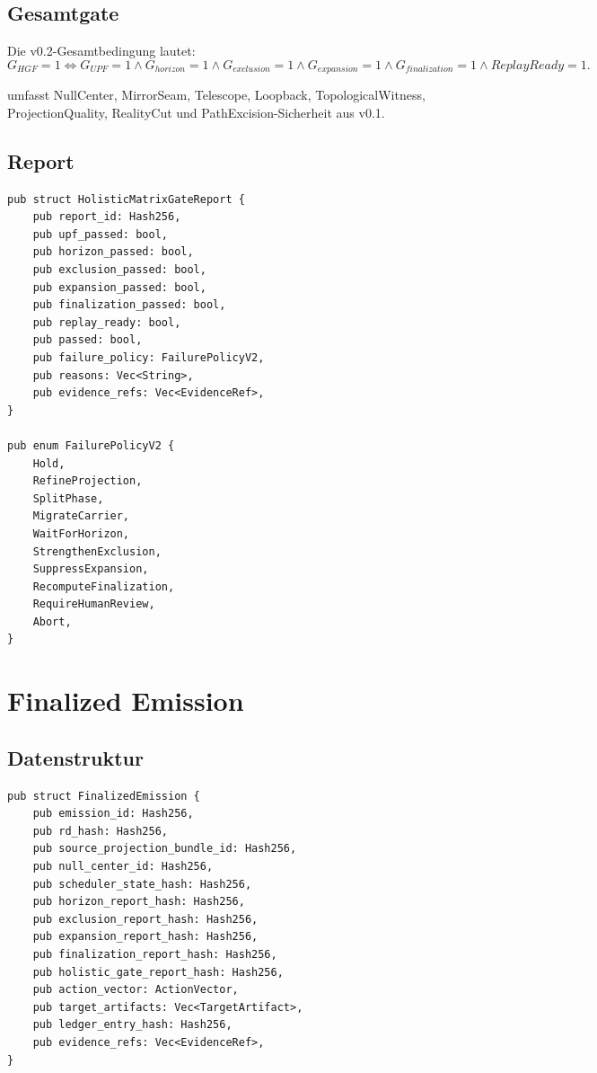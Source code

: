 \documentclass[11pt,a4paper]{article}
\newcommand{\code}[1]{\texttt{\detokenize{#1}}}
\begin{document}
\subsection{Gesamtgate}
Die v0.2-Gesamtbedingung lautet:
\[
G_{HGF}=1 \Longleftrightarrow
G_{UPF}=1
\wedge G_{horizon}=1
\wedge G_{exclusion}=1
\wedge G_{expansion}=1
\wedge G_{finalization}=1
\wedge ReplayReady=1.
\]

\code{G_UPF} umfasst NullCenter, MirrorSeam, Telescope, Loopback, TopologicalWitness, ProjectionQuality, RealityCut und PathExcision-Sicherheit aus v0.1.

\subsection{Report}
\begin{lstlisting}
pub struct HolisticMatrixGateReport {
    pub report_id: Hash256,
    pub upf_passed: bool,
    pub horizon_passed: bool,
    pub exclusion_passed: bool,
    pub expansion_passed: bool,
    pub finalization_passed: bool,
    pub replay_ready: bool,
    pub passed: bool,
    pub failure_policy: FailurePolicyV2,
    pub reasons: Vec<String>,
    pub evidence_refs: Vec<EvidenceRef>,
}

pub enum FailurePolicyV2 {
    Hold,
    RefineProjection,
    SplitPhase,
    MigrateCarrier,
    WaitForHorizon,
    StrengthenExclusion,
    SuppressExpansion,
    RecomputeFinalization,
    RequireHumanReview,
    Abort,
}
\end{lstlisting}

\section{Finalized Emission}

\subsection{Datenstruktur}
\begin{lstlisting}
pub struct FinalizedEmission {
    pub emission_id: Hash256,
    pub rd_hash: Hash256,
    pub source_projection_bundle_id: Hash256,
    pub null_center_id: Hash256,
    pub scheduler_state_hash: Hash256,
    pub horizon_report_hash: Hash256,
    pub exclusion_report_hash: Hash256,
    pub expansion_report_hash: Hash256,
    pub finalization_report_hash: Hash256,
    pub holistic_gate_report_hash: Hash256,
    pub action_vector: ActionVector,
    pub target_artifacts: Vec<TargetArtifact>,
    pub ledger_entry_hash: Hash256,
    pub evidence_refs: Vec<EvidenceRef>,
}
\end{lstlisting}
\end{document}
